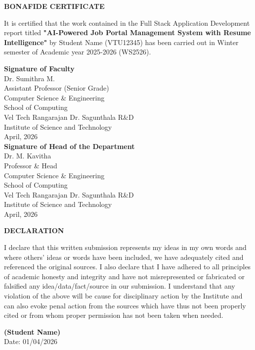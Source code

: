 \documentclass[12pt]{report}
\begin{document}
\newpage 
{} 
\begin{center} 
{\Huge \textbf{BONAFIDE CERTIFICATE}}\\[0.8cm] 
\end{center} 
\linespread{1.5}\selectfont 
\large{It is certified that the work contained in the Full Stack Application Development report titled \textbf{"AI-Powered Job Portal Management System with Resume Intelligence"} by Student Name (VTU12345) has been carried out in Winter semester of Academic year 2025-2026 (WS2526).} 
\vspace{2.5cm} 
\begin{flushright} 
\textbf{Signature of Faculty}\\[0.2cm]
Dr. Sumithra M.\\
Assistant Professor (Senior Grade)\\
Computer Science \& Engineering\\
School of Computing\\
Vel Tech Rangarajan Dr. Sagunthala R\&D\\
Institute of Science and Technology\\
April, 2026\\[2.0cm] 
\textbf{Signature of Head of the Department}\\[0.2cm]
Dr. M. Kavitha\\
Professor \& Head\\
Computer Science \& Engineering\\
School of Computing\\
Vel Tech Rangarajan Dr. Sagunthala R\&D\\
Institute of Science and Technology\\
April, 2026\\  
\end{flushright} 
 
\newpage 
\begin{center} 
\Huge \textbf{DECLARATION} 
\end{center} 
\linespread{1.5}\selectfont 
\vspace{1cm}
\large{ 
 I declare that this written submission represents my ideas in my own words and where others' ideas or words have been included, we have adequately cited and referenced the original sources. I also declare that I have adhered to all principles of academic honesty and integrity and have not misrepresented or fabricated or falsified any idea/data/fact/source in our submission. I understand that any violation of the above will be cause for disciplinary action by the Institute and can also evoke penal action from the sources which have thus not been properly cited or from whom proper permission has not been taken when needed.
} 
\vspace{3.0cm} 
\begin{flushright} 
\large{\textbf{(Student Name)}}\\ 
\large{Date: 01/04/2026}\\[2.0cm] 
\end{flushright} 
 
\end{document}
